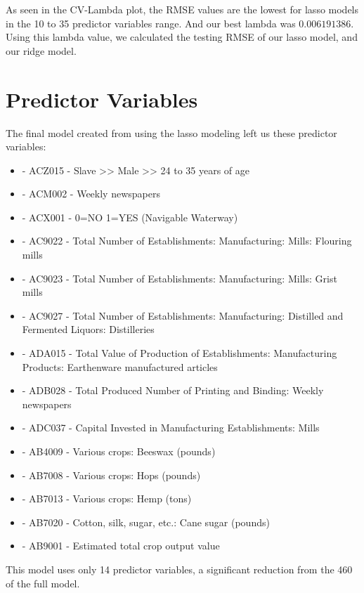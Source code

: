 \documentclass[a4paper,12pt]{article}
\begin{document}
As seen in the CV-Lambda plot, the RMSE values are the lowest for lasso models in the 10 to 35 predictor variables range. And our best lambda was $0.006191386$.
Using this lambda value, we calculated the testing RMSE of our lasso model, and our ridge model.

\section{Predictor Variables}
The final model created from using the lasso modeling left us these predictor variables:

\begin{itemize}
    \item - ACZ015 - Slave >> Male >> 24 to 35 years of age
    \item - ACM002 - Weekly newspapers
    \item - ACX001 - 0=NO 1=YES (Navigable Waterway)
    \item - AC9022 - Total Number of Establishments: Manufacturing: Mills: Flouring mills
    \item - AC9023 - Total Number of Establishments: Manufacturing: Mills: Grist mills
    \item - AC9027 - Total Number of Establishments: Manufacturing: Distilled and Fermented Liquors: Distilleries
    \item - ADA015 - Total Value of Production of Establishments: Manufacturing Products: Earthenware manufactured articles
    \item - ADB028 - Total Produced Number of Printing and Binding: Weekly newspapers
    \item - ADC037 - Capital Invested in Manufacturing Establishments: Mills
    \item - AB4009 - Various crops: Beeswax (pounds)
    \item - AB7008 - Various crops: Hops (pounds)
    \item - AB7013 - Various crops: Hemp (tons)
    \item - AB7020 - Cotton, silk, sugar, etc.: Cane sugar (pounds)
    \item - AB9001 - Estimated total crop output value

\end{itemize}


This model uses only 14 predictor variables, a significant reduction from the 460 of the full model. 
\end{document}
